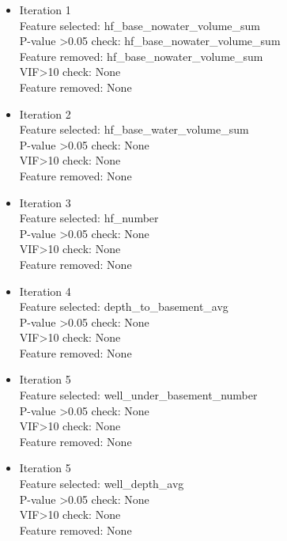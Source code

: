 \documentclass[final-report]{report-template}
\begin{document}
\begin{itemize}
\item Iteration 1\\
Feature selected: hf\_base\_nowater\_volume\_sum\\
P-value \textgreater 0.05 check: hf\_base\_nowater\_volume\_sum\\
Feature removed: hf\_base\_nowater\_volume\_sum\\
VIF\textgreater 10 check: None\\
Feature removed: None

\item Iteration 2\\
Feature selected: hf\_base\_water\_volume\_sum\\
P-value \textgreater 0.05 check: None\\
VIF\textgreater 10 check: None\\
Feature removed: None\\

\item Iteration 3\\
Feature selected: hf\_number\\
P-value \textgreater 0.05 check: None\\
VIF\textgreater 10 check: None\\
Feature removed: None\\

\item Iteration 4\\
Feature selected: depth\_to\_basement\_avg\\
P-value \textgreater 0.05 check: None\\
VIF\textgreater 10 check: None\\
Feature removed: None\\

\item Iteration 5\\
Feature selected: well\_under\_basement\_number\\
P-value \textgreater 0.05 check: None\\
VIF\textgreater 10 check: None\\
Feature removed: None\\

\item Iteration 5\\
Feature selected: well\_depth\_avg\\
P-value \textgreater 0.05 check: None\\
VIF\textgreater 10 check: None\\
Feature removed: None\\


\end{itemize}
\end{document}
